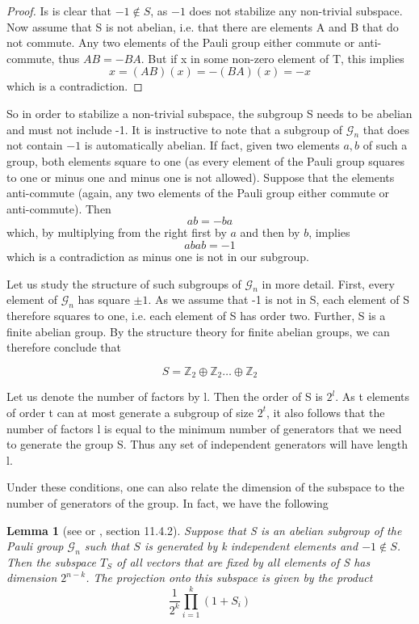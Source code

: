 \documentclass[a4paper, draft]{article}
\theoremstyle{own}
\newtheorem{lem}[thm]{Lemma}
\theoremstyle{remark}
\newcommand{\Z}{\mathbb{Z}}
\begin{document}
\begin{proof}
Is is clear that $-1 \notin S$, as $-1$ does not stabilize any non-trivial subspace. Now assume that S is not abelian, i.e. that there are elements A and B that do not commute. Any two elements of the Pauli group either commute or anti-commute, thus $AB = - BA$. But if x in some non-zero element of T, this implies
$$
x = (AB)(x) = - (BA)(x) = - x
$$
which is a contradiction.
\end{proof}
	
	
So in order to stabilize a non-trivial subspace, the subgroup S needs to be abelian and must not include -1. It is instructive to note that a subgroup of $\mathcal{G}_n$ that does not contain $-1$ is automatically abelian. If fact, given two elements $a, b$ of such a group, both elements square to one (as every element of the Pauli group squares to one or minus one and minus one is not allowed). Suppose that the elements anti-commute (again, any two elements of the Pauli group either commute or anti-commute). Then
$$
ab = -ba
$$
which, by multiplying from the right first by $a$ and then by $b$, implies
$$
abab = -1
$$
which is a contradiction as minus one is not in our subgroup.

Let us study the structure of such subgroups of $\mathcal{G}_n$ in more detail. First, every element of $\mathcal{G}_n$ has square $\pm 1$. As we assume that -1 is not in S, each element of S therefore squares to one, i.e. each element of S has order two. Further, S is a finite abelian group. By the structure theory for finite abelian groups, we can therefore conclude that 

$$
S = {\Z}_2  \oplus \Z_2 \dots \oplus \Z_2
$$

Let us denote the number of factors by l. Then the order of S is $2^l$. As t elements of order t can at most generate a subgroup of size $2^t$, it also follows that the number of factors l is equal to the minimum number of generators that we need to generate the group S. Thus any set of independent generators will have length l. 

Under these conditions, one can also relate the dimension of the subspace to the number of generators of the group. In fact, we have the following

\begin{lem}[see \cite{G2} or \cite{RieffelPolak}, section 11.4.2]\label{lem:stabilizerdimension}
Suppose that S is an abelian subgroup of the Pauli group $\mathcal{G}_n$ such that $S$ is generated by k independent elements and $-1 \notin S$. Then the subspace $T_S$ of all vectors that are fixed by all elements of S has dimension $2^{n-k}$.  The projection onto this subspace is given by the product
$$
\frac{1}{2^k} \prod_{i=1}^k (1 + S_i)
$$
\end{lem}
\end{document}
